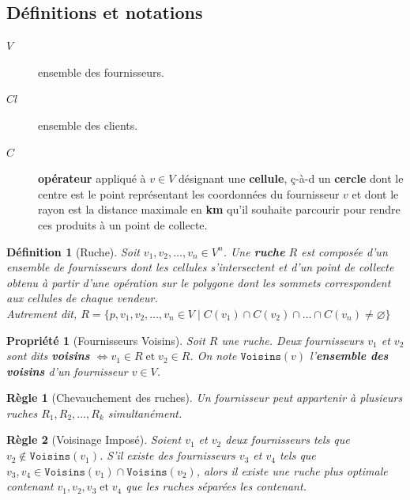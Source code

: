 \documentclass[a4paper,12pt]{book}
\theoremstyle{break}
\theoremstyle{break}
\newtheorem{definition}{Définition}
\theoremstyle{break}
\newtheorem{property}{Propriété}
\theoremstyle{break}
\newtheorem{constraint}{Règle}
\theoremstyle{definition}
\theoremstyle{remark}
\begin{document}
\subsection{Définitions et notations}
\begin{description}
  \item[$V$]{ensemble des fournisseurs.}
  \item[$Cl$]{ensemble des clients.}
  \item[$C$]{\textbf{opérateur} appliqué à $v \in V$ désignant une \textbf{cellule}, ç-à-d un \textbf{cercle} dont le centre est le point représentant les coordonnées du fournisseur $v$ et dont le rayon est la distance maximale en \textbf{km} qu'il souhaite parcourir pour rendre ces produits à un point de collecte.}
\end{description}

\begin{definition}[Ruche]
Soit $v_1, v_2, \dots, v_n \in V^n$. Une \textbf{ruche} $R$ est composée d'un ensemble de fournisseurs dont les cellules s'intersectent et d'un point de collecte obtenu à partir d'une opération sur le polygone dont les sommets correspondent aux cellules de chaque vendeur.\\
Autrement dit, $R = \{p, v_1, v_2, \dots, v_n \in V\; |\; C(v_1) \cap C(v_2) \cap \dots \cap C(v_n) \neq \varnothing\}$
\end{definition}

\begin{property}[Fournisseurs Voisins]
Soit $R$ une ruche. Deux fournisseurs $v_1$ et $v_2$ sont dits \textbf{voisins} $\iff v_1 \in R\; \text{et}\; v_2 \in R$. On note $\texttt{Voisins}(v)$ l'\textbf{ensemble des voisins} d'un fournisseur $v \in V$.
\end{property}

\begin{constraint}[Chevauchement des ruches]
Un fournisseur peut appartenir à plusieurs ruches $R_1, R_2, \dots, R_k$ simultanément.
\end{constraint}

\begin{constraint}[Voisinage Imposé]
Soient $v_1$ et $v_2$ deux fournisseurs tels que $v_2 \notin \texttt{Voisins}(v_1)$. S'il existe des fournisseurs $v_3$ et $v_4$ tels que $v_3, v_4 \in \texttt{Voisins}(v_1) \cap \texttt{Voisins}(v_2)$, alors il existe une ruche plus optimale contenant $v_1, v_2, v_3\; \text{et}\; v_4$ que les ruches séparées les contenant.
\end{constraint}
\end{document}
